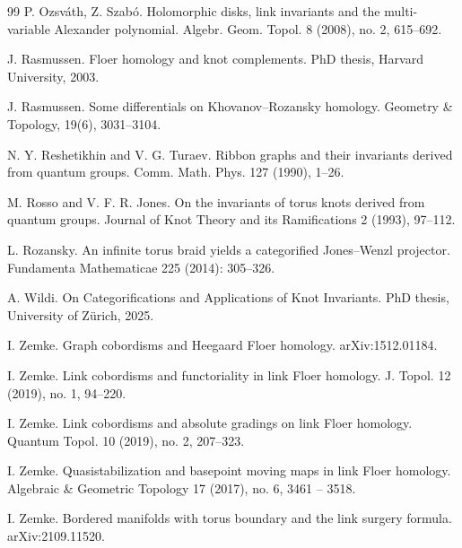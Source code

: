 \documentclass[10pt,a4paper]{amsart}
\begin{document}
\begin{thebibliography}{99}
 P. Ozsv\'ath, Z. Szab\'o. Holomorphic disks, link invariants and the multi-variable  Alexander polynomial. Algebr. Geom. Topol. 8 (2008), no. 2, 615--692.

 J. Rasmussen. Floer homology and knot complements. PhD thesis, Harvard University, 2003.



 J. Rasmussen. Some differentials on Khovanov–Rozansky homology. Geometry \& Topology, 19(6), 3031--3104.

  N. Y. Reshetikhin and V. G. Turaev. Ribbon graphs and their invariants derived from
quantum groups. Comm. Math. Phys. 127 (1990), 1--26.

 M. Rosso and V. F. R. Jones. On the invariants of torus knots derived from quantum groups. Journal of Knot Theory and its 
Ramifications 2 (1993), 97--112.

 L. Rozansky. An infinite torus braid yields a categorified Jones--Wenzl projector. Fundamenta Mathematicae 225 (2014): 305--326.

 A. Wildi. On Categorifications and Applications of Knot Invariants. PhD thesis, University of Z\"urich, 2025.


 I. Zemke. Graph cobordisms and Heegaard Floer homology. arXiv:1512.01184.

 I. Zemke. Link cobordisms and functoriality in link Floer homology. J. Topol. 12 (2019), no. 1, 94--220. 

 I. Zemke. Link cobordisms and absolute gradings on link Floer homology. Quantum Topol. 10 (2019), no. 2, 207--323. 

 I. Zemke. Quasistabilization and basepoint moving maps in link Floer homology. Algebraic \& Geometric Topology 17 (2017), no. 6, 3461 -- 3518.

 I. Zemke. Bordered manifolds with torus boundary and the link surgery formula. arXiv:2109.11520.


\end{thebibliography}
\end{document}
